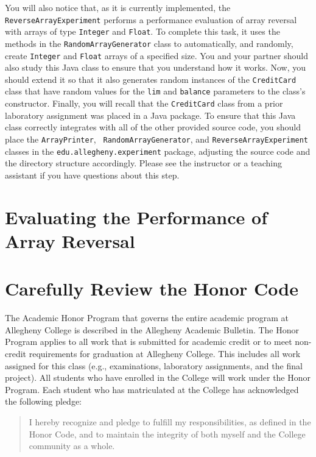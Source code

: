 You will also notice that, as it is currently implemented, the {\tt ReverseArrayExperiment} performs a performance
evaluation of array reversal with arrays of type {\tt Integer} and {\tt Float}. To complete this task, it uses the
methods in the {\tt RandomArrayGenerator} class to automatically, and randomly, create {\tt Integer} and {\tt Float}
arrays of a specified size. You and your partner should also study this Java class to ensure that you understand how it
works. Now, you should extend it so that it also generates random instances of the {\tt CreditCard} class that have
random values for the {\tt lim} and {\tt balance} parameters to the class's constructor. Finally, you will recall that
the {\tt CreditCard} class from a prior laboratory assignment was placed in a Java package. To ensure that this Java
class correctly integrates with all of the other provided source code, you should place the {\tt ArrayPrinter}, {\tt
RandomArrayGenerator}, and {\tt ReverseArrayExperiment} classes in the {\tt edu.allegheny.experiment} package, adjusting
the source code and the directory structure accordingly. Please see the instructor or a teaching assistant if you have
questions about this step.

\section*{Evaluating the Performance of Array Reversal}



\section*{Carefully Review the Honor Code}

The Academic Honor Program that governs the entire academic program at Allegheny College is described in the Allegheny
Academic Bulletin.  The Honor Program applies to all work that is submitted for academic credit or to meet non-credit
requirements for graduation at Allegheny College.  This includes all work assigned for this class (e.g., examinations,
  laboratory assignments, and the final project).  All students who have enrolled in the College will work under the Honor
Program.  Each student who has matriculated at the College has acknowledged the following pledge:

\vspace*{-.1in}
\begin{quote}
  I hereby recognize and pledge to fulfill my responsibilities, as defined in the Honor Code, and to maintain the
  integrity of both myself and the College community as a whole.
\end{quote}
\vspace*{-.1in}

